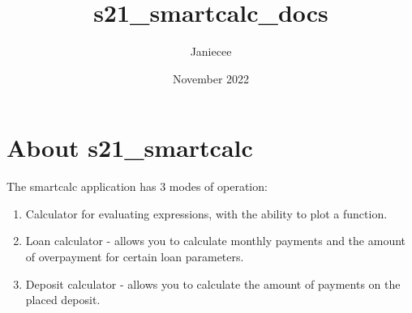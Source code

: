 \documentclass[14pt, letterpaper]{article}
\title{s21\_smartcalc\_docs}
\author{Janiecee}
\date{November 2022}
\begin{document}
\maketitle

\section*{About s21\_smartcalc}

The smartcalc application has 3 modes of operation:

\begin{enumerate}
    \item Calculator for evaluating expressions, with the ability to plot a function.
    \item Loan calculator - allows you to calculate monthly payments and the amount of overpayment for certain loan parameters.
    \item Deposit calculator - allows you to calculate the amount of payments on the placed deposit.
\end{enumerate}
\end{document}
